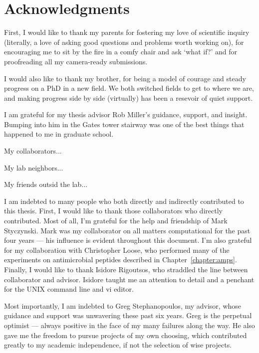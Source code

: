 \cleardoublepage

\section*{Acknowledgments}

First, I would like to thank my parents for fostering my love of scientific inquiry (literally, a love of asking good questions and problems worth working on), for encouraging me to sit by the fire in a comfy chair and ask `what if?' and for proofreading all my camera-ready submissions. 

I would also like to thank my brother, for being a model of courage and steady progress on a PhD in a new field. We both switched fields to get to where we are, and making progress side by side (virtually) has been a resevoir of quiet support.

I am grateful for my thesis advisor Rob Miller's guidance, support, and insight. Bumping into him in the Gates tower stairway was one of the best things that happened to me in graduate school. 

My collaborators...

My lab neighbors...

My friends outsid the lab...



I am indebted to many people who both directly and indirectly
contributed to this thesis.  First, I would like to thank those
collaborators who directly contributed.  Most of all, I'm grateful
for the help and friendship of Mark Styczynski. Mark was my
collaborator on all matters computational for the past four years
--- his influence is evident throughout this document.  I'm also
grateful for my collaboration with Christopher Loose, who performed
many of the experiments on antimicrobial peptides described in
Chapter~\ref{chapter:amps}.  Finally, I would like to thank Isidore Rigoutsos, who
straddled the line between collaborator and advisor.  Isidore taught
me an attention to detail and a penchant for the UNIX command line
and vi editor.

Most importantly, I am indebted to Greg Stephanopoulos, my advisor,
whose guidance and support was unwavering these past six years. Greg
is the perpetual optimist --- always positive in the face of my many
failures along the way.  He also gave me the freedom to pursue
projects of my own choosing, which contributed greatly to my
academic independence, if not the selection of wise projects.

